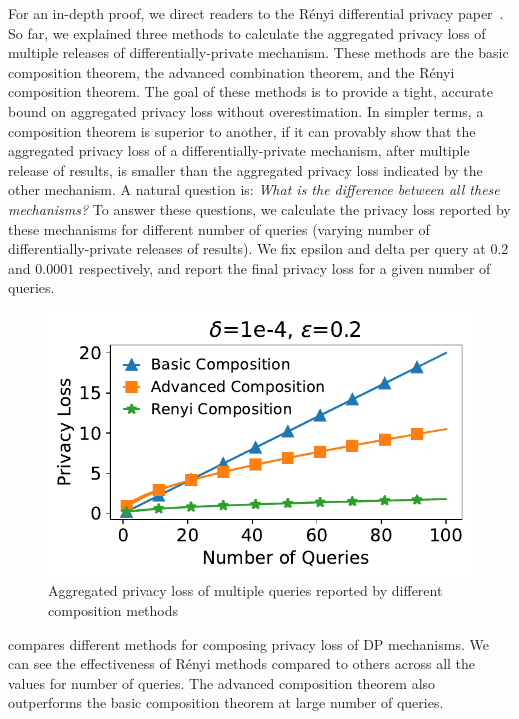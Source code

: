 \noindent For an in-depth proof, we direct readers to the R\'enyi differential privacy paper~\cite{mironov2017renyi}.
So far, we explained three methods to calculate the aggregated privacy loss of multiple releases of differentially-private mechanism.
These methods are the basic composition theorem, the advanced combination theorem, and the R\'enyi composition theorem.
The goal of these methods is to provide a tight, accurate bound on aggregated privacy loss without overestimation. 
In simpler terms, a composition theorem is superior to another, if it can provably show that the aggregated privacy loss of a differentially-private mechanism, after multiple release of results, is smaller than the aggregated privacy loss indicated by the other mechanism.
A natural question is: \textit{What is the difference between all these mechanisms?}
To answer these questions, we calculate the privacy loss reported by these mechanisms for different number of queries (\ie varying number of differentially-private releases of results).
We fix epsilon and delta per query at $0.2$ and $0.0001$ respectively, and report the final privacy loss for a given number of queries.
\begin{figure}[t]
  \centering
  \includegraphics[width=\columnwidth]{plots/composition_comparison.pdf}
  \caption{Aggregated privacy loss of multiple queries reported by different composition methods}
  \label{fig:composition-comparison}
\end{figure}

 compares different methods for composing privacy loss of DP mechanisms.
We can see the effectiveness of R\'enyi methods compared to others across all the values for number of queries.
The advanced composition theorem also outperforms the basic composition theorem at large number of queries. 


